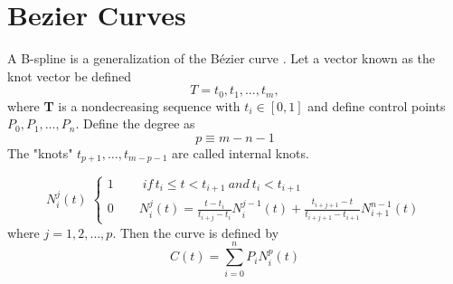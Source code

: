 \documentclass[b5paper,twoside,11pt]{article}
\begin{document}
\section{Bezier Curves}
A B-spline is a generalization of the Bézier curve \cite{BSpline}. Let a vector known as the knot vector be defined 
\begin{equation*}
T={t_0,t_1,\ldots,t_m},
\end{equation*}
where \textbf{T} is a nondecreasing sequence with $t_i\in[0,1]$ and define control points \textbf{$P_0,P_1,\ldots,P_n$}. Define the degree as
\begin{equation*}
p\equiv m-n-1
\end{equation*}
The "knots" $t_{p+1},\ldots,t_{m-p-1}$ are called internal knots.


\begin{equation*} N_{i}^{j}(t)\;
\begin{cases} 1\qquad \;if \, t_i\leq t< t_{i+1}\:and\: t_i<t_{i+1} \\ 
0 \qquad   N_{i}^{j}(t)=\frac{t-t_i}{t_{i+j}-t_i} N_{i}^{j-1}(t) + \frac{t_{i+j+1} - t}{t_{i+j+1} - t_{i+1}} N_{i+1}^{n-1}(t)
 \end{cases}
  \end{equation*}
  where $j=1,2,\ldots,p$. Then the curve is defined by
  \begin{equation*}
  C(t)=\sum\limits_{i=0}^n P_i N_{i}^{p}(t)
  \end{equation*}
\end{document}
